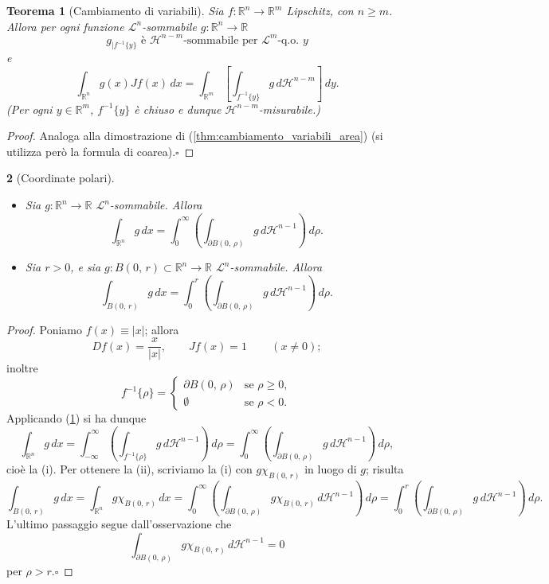\documentclass[a4paper,10pt,openright,oneside]{book}
\theoremstyle{theoremstyle}
\newtheorem{teorema}{Teorema}[section]
\theoremstyle{theoremstylewoheader}
\newtheorem{teorema2}[teorema]{}
\theoremstyle{theoremstyle}
\theoremstyle{proofsecstyle}
\theoremstyle{nonumberplain}
\newtheorem{proof}{Dim.}
\newcommand{\RR}{\ensuremath{\mathbb{R}}}
\newcommand{\Leb}{\ensuremath{\mathcal{L}}}
\newcommand{\Haus}{\ensuremath{\mathcal{H}}}
\newcommand{\abs}[1]{\ensuremath{\lvert #1 \rvert}}
\newcommand{\boundary}[1]{\ensuremath{\partial #1}}
\newcommand{\qogni}[2]{\ensuremath{#2\text{-q.o. $\!#1$}}}
\renewcommand{\qedsymbol}{\ensuremath{\square}}
\newcommand{\qed}{\unskip\nobreak\hfill\nobreak\hspace{.5em}\qedsymbol}
\begin{document}
\begin{teorema}[Cambiamento di variabili]
\label{thm:cambiamento_variabili_coarea}
Sia $f : \RR^n \rightarrow \RR^m$ Lipschitz, con $n \ge m$. Allora per ogni funzione $\Leb^n$-sommabile $g : \RR^n \rightarrow \RR$
\[
g_{|f^{-1}\{y\}}\text{ è $\Haus^{n-m}$-sommabile per $\qogni{y}{\Leb^m}$}
\]
e
\[
\int_{\RR^n} g(x)Jf(x)\, dx = \int_{\RR^m} \left[\int_{f^{-1}\{y\}} g\, d\Haus^{n-m}\right]\, dy.
\]
(Per ogni $y \in \RR^m$, $f^{-1}\{y\}$ è chiuso e dunque $\Haus^{n-m}$-misurabile.)
\end{teorema}

\begin{proof}
Analoga alla dimostrazione di (\ref{thm:cambiamento_variabili_area}) (si utilizza però la formula di coarea).\qed
\end{proof}

\begin{teorema2}[Coordinate polari]
\label{thm:coordinate_polari}
\mbox{}
\begin{itemize}
\item[(i)] Sia $g : \RR^n \rightarrow \RR$ $\Leb^n$-sommabile. Allora
\[
\int_{\RR^n} g\, dx = \int_0^\infty \left(\int_{\boundary{B(0,\, \rho)}} g\, d\Haus^{n-1}\right)\, d\rho.
\]
\item[(ii)] Sia $r > 0$, e sia $g : B(0,\, r) \subset \RR^n \rightarrow \RR$ $\Leb^n$-sommabile. Allora
\[
\int_{B(0,\, r)} g\, dx = \int_0^r \left(\int_{\boundary{B(0,\, \rho)}} g\, d\Haus^{n-1}\right)\, d\rho.
\]
\end{itemize}
\end{teorema2}

\begin{proof}
Poniamo $f(x) \equiv \abs{x}$; allora
\[
Df(x) = \frac{x}{\abs{x}},\qquad Jf(x) = 1\,\qquad (x \ne 0);
\]
inoltre
\[
f^{-1}\{\rho\} = \begin{cases}
\boundary{B(0,\, \rho)} & \text{se $\rho \ge 0$},\\
\emptyset & \text{se $\rho < 0$}.
\end{cases}
\]
Applicando (\ref{thm:cambiamento_variabili_coarea}) si ha dunque 
\[
\int_{\RR^n} g\, dx = \int_{-\infty}^\infty \left(\int_{f^{-1}\{\rho\}} g\, d\Haus^{n-1}\right)\, d\rho = \int_0^\infty \left(\int_{\boundary{B(0,\, \rho)}} g\, d\Haus^{n-1}\right)\, d\rho,
\]
cioè la (i). Per ottenere la (ii), scriviamo la (i) con $g\chi_{B(0,\, r)}$ in luogo di $g$; risulta 
\[
\int_{B(0,\, r)} g\, dx = \int_{\RR^n} g\chi_{B(0,\, r)}\, dx = \int_0^\infty \left(\int_{\boundary{B(0,\, \rho)}} g\chi_{B(0,\, r)}\, d\Haus^{n-1}\right)\, d\rho = \int_0^r \left(\int_{\boundary{B(0,\, \rho)}} g\, d\Haus^{n-1}\right)\, d\rho.
\]
L'ultimo passaggio segue dall'osservazione che 
\[
\int_{\boundary{B(0,\, \rho)}} g\chi_{B(0,\, r)}\, d\Haus^{n-1} = 0
\]
per $\rho > r$.\qed
\end{proof}
\pagebreak
\end{document}
